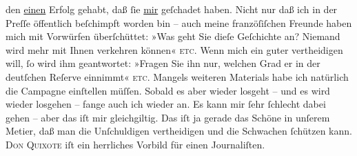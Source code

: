                den \uline{einen} Erfolg gehabt, daß{ }ſie \uline{mir} geſchadet haben. Nicht nur daß ich in der Preſſe öffentlich
               beſchimpft worden bin – auch meine franzöſiſchen Freunde haben mich mit Vorwürfen überſchüttet: »Was geht Sie
               dieſe Geſchichte an? Niemand wird mehr mit Ihnen verkehren können« \textsc{etc.} Wenn mich ein guter {\pb}\label{K_L02786-5v}\label{K_L02786-5} vertheidigen will,{ }ſo wird ihm geantwortet: »Fragen Sie ihn
               nur, welchen Grad er in der deutſchen Reſerve einnimmt« \textsc{etc}. Mangels weiteren
               Materials habe ich natürlich die Campagne einſtellen müſſen. Sobald es aber wieder
               losgeht – und es wird wieder losgehen – fange auch ich wieder an. Es kann mir{ }ſehr{ }ſchlecht dabei gehen – aber das iſt  mir
               gleichgiltig. Das iſt ja gerade das Schöne in unſerem Metier, daß {\pb}man die Unſchuldigen vertheidigen und die Schwachen{ }ſchützen kann. \textsc{Don Quixote} iſt ein herrliches Vorbild für einen 
               Journaliſten.\pend
           
